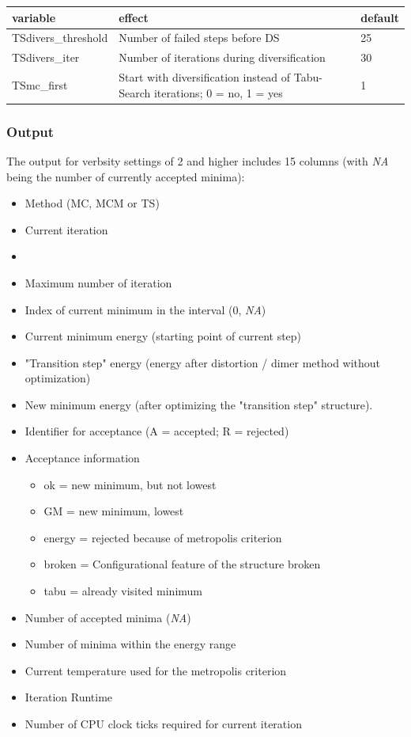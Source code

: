 \documentclass[10pt,a4paper]{article} %
\begin{document}
	\begin{longtable}{|p{3.5cm}|p{5cm}|p{2.5cm}|}
		variable & effect & default \\
		\hline
		TSdivers\_threshold & Number of failed steps before \acl{DS} & 25 \\
		TSdivers\_iter & Number of iterations during diversification & 30 \\
		TSmc\_first & Start with diversification instead of Tabu-Search iterations; 0 = no, 1 = yes & 1 \\
	\end{longtable}

	\subsubsection{Output}
	The output for verbsity settings of 2 and higher includes 15 columns (with \textit{NA} being the number of currently accepted minima):\\
	\begin{itemize}
		\item Method (\ac{MC}, \ac{MCM} or \ac{TS})
		\item Current iteration
		\item {} 
		\item Maximum number of iteration
		\item Index of current minimum in the interval (0, \textit{NA})
		\item Current minimum energy (starting point of current step)
		\item "Transition step" energy (energy after distortion / dimer method without optimization)
		\item New minimum energy (after optimizing the "transition step" structure).
		\item Identifier for acceptance (A = accepted; R = rejected)
		\item Acceptance information
		\begin{itemize}
			\item ok = new minimum, but not lowest
			\item GM = new minimum, lowest
			\item energy = rejected because of metropolis criterion
			\item broken = Configurational feature of the structure broken
			\item tabu = already visited minimum
		\end{itemize}
		\item Number of accepted minima (\textit{NA})
		\item Number of minima within the energy range
		\item Current temperature used for the metropolis criterion
		\item Iteration Runtime
		\item Number of CPU clock ticks required for current iteration
	\end{itemize}
	
\end{document}

